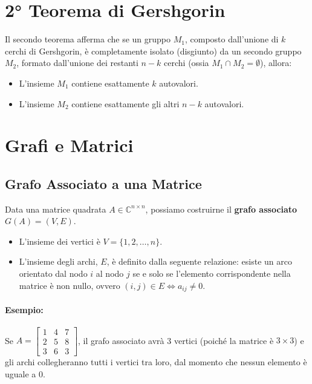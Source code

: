 \documentclass[a4paper,12pt]{article}
\begin{document}
	\section{2° Teorema di Gershgorin}
	
	Il secondo teorema afferma che se un gruppo $M_1$, composto dall'unione di $k$ cerchi di Gershgorin, è completamente isolato (disgiunto) da un secondo gruppo $M_2$, formato dall'unione dei restanti $n-k$ cerchi (ossia $M_1 \cap M_2 = \emptyset$), allora:
	\begin{itemize}
		\item L'insieme $M_1$ contiene esattamente $k$ autovalori.
		\item L'insieme $M_2$ contiene esattamente gli altri $n-k$ autovalori.
	\end{itemize}
	
	\section{Grafi e Matrici}
	
	\subsection{Grafo Associato a una Matrice}
	Data una matrice quadrata $A \in \mathbb{C}^{n \times n}$, possiamo costruirne il \textbf{grafo associato} $G(A) = (V, E)$.
	\begin{itemize}
		\item L'insieme dei vertici è $V = \{1, 2, \dots, n\}$.
		\item L'insieme degli archi, $E$, è definito dalla seguente relazione: esiste un arco orientato dal nodo $i$ al nodo $j$ se e solo se l'elemento corrispondente nella matrice è non nullo, ovvero $(i, j) \in E \iff a_{ij} \neq 0$.
	\end{itemize}
	
	\paragraph{Esempio:}
	Se $A = \begin{bmatrix} 1 & 4 & 7 \\ 2 & 5 & 8 \\ 3 & 6 & 3 \end{bmatrix}$, il grafo associato avrà 3 vertici (poiché la matrice è $3 \times 3$) e gli archi collegheranno tutti i vertici tra loro, dal momento che nessun elemento è uguale a $0$.
	
\end{document}
